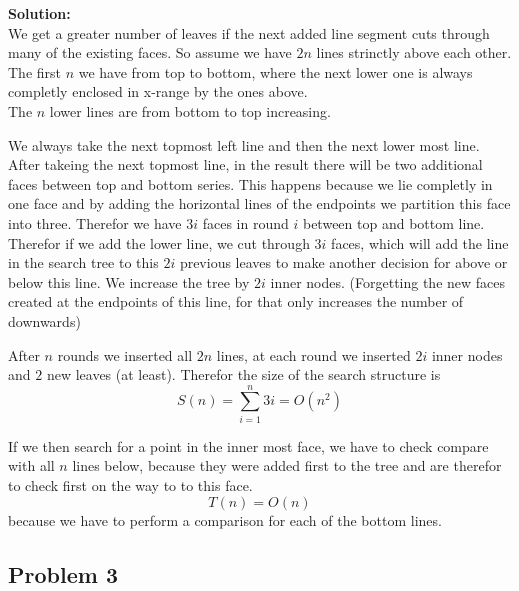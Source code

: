 \documentclass[11pt,a4paper,ngerman]{article}
\begin{document}
\textbf{Solution:}\\

We get a greater number of leaves if the next added line segment cuts
through many of the existing faces.
So assume we have $2n$ lines strinctly above each other. The 
first $n$ we have from top to bottom, where the next lower one
is always completly enclosed in x-range by the ones above.\\
The $n$ lower lines are from bottom to top increasing.\\

\vspace{5cm}

We always take the next topmost left line and then the next lower most line.\\
After takeing the next topmost line, in the result there will
be two additional faces between top and bottom series. This happens
because we lie completly in one face and by adding the horizontal lines
of the endpoints we partition this face into three. Therefor
we have $3i$ faces in round $i$ between top and bottom line.\\

Therefor if we add the lower line, we cut through $3i$ faces, which will
add the line in the search tree to this $2i$ previous leaves to make
another decision for above or below this line. We increase the tree by
$2i$ inner nodes. (Forgetting the new faces created at the endpoints of
this line, for that only increases the number of downwards)

After $n$ rounds we inserted all $2n$ lines, at each round we inserted
$2i$ inner nodes and $2$ new leaves (at least).
Therefor the size of the search structure is
\begin{equation*}
    S(n) = \overset{n}{\underset{i=1}{\sum}} 3i = O(n^2)
\end{equation*}

If we then search for a point in the inner most face, we have to
check compare with all $n$ lines below, because they were added first to the tree and are therefor to check first on the way to to this face.
\begin{equation*}
    T(n) = O(n)
\end{equation*}
because we have to perform a comparison for each of the bottom lines.

\subsection*{Problem 3}
\end{document}
